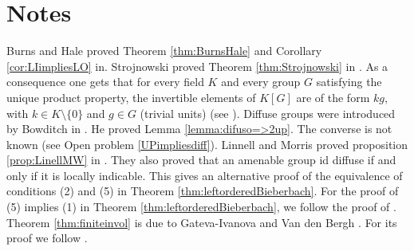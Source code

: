 \section{Notes}
Burns and Hale proved Theorem \ref{thm:BurnsHale} and Corollary \ref{cor:LIimpliesLO} in\cite{MR310046}. 
Strojnowski proved Theorem \ref{thm:Strojnowski} in \cite{MR558112}. As a consequence one gets that for every field $K$ and every group $G$ satisfying the unique product property, the invertible elements of $K[G]$ are of the form $kg$, with $k\in K\setminus\{ 0\}$ and $g\in G$ (trivial units) (see \cite[page 591]{MR0470211}).
Diffuse groups were introduced by Bowditch in \cite{MR1794287}. He proved Lemma \ref{lemma:difuso=>2up}. The converse is not known (see Open problem \ref{UPimpliesdiff}). Linnell and Morris proved proposition \ref{prop:LinellMW} in \cite{MR3231224}. They also proved that an amenable group id diffuse if and only if it is locally indicable. This gives an alternative proof of the equivalence of conditions (2) and (5) in Theorem \ref{thm:leftorderedBieberbach}. For the proof of (5) implies (1) in Theorem \ref{thm:leftorderedBieberbach}, we follow the proof of \cite[Lemma 3.4]{MR3548136}. Theorem \ref{thm:finiteinvol} is due to Gateva-Ivanova and Van den Bergh \cite{MR1637256}. For its proof we follow \cite[Corollary 8.2.6]{MR2301033}.  
